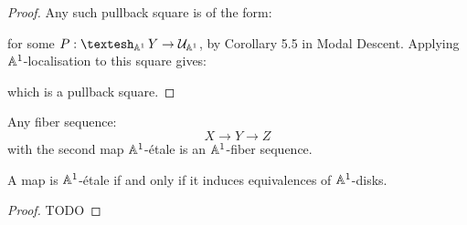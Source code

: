 \begin{proof}
Any such pullback square is of the form:
  \begin{center}
  \end{center}
for some $P: \shape_{\A^1}Y \to {\mathcal U}_{\A^1}$, by Corollary 5.5 in Modal Descent. Applying $\mathbb{A}^1$-localisation to this square gives:
  \begin{center}
  \end{center}
  which is a pullback square.
\end{proof}

\begin{corollary}
Any fiber sequence:
\[X\to Y\to Z\]
with the second map $\mathbb{A}^1$-étale is an $\mathbb{A}^1$-fiber sequence.
\end{corollary}

\begin{lemma}
A map is $\mathbb{A}^1$-étale if and only if it induces equivalences of $\mathbb{A}^1$-disks. 
\end{lemma}

\begin{proof}
TODO
\end{proof}